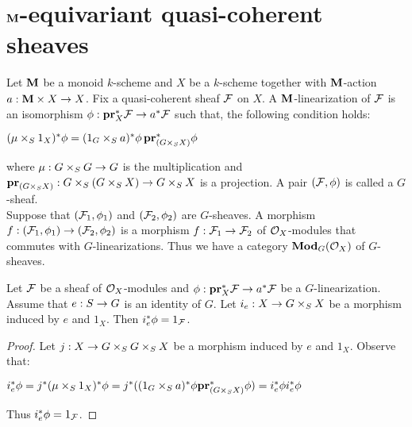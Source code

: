 \section{$\mathbf{M}$-equivariant quasi-coherent sheaves}

\begin{definition}
Let $\mathbf{M}$ be a monoid $k$-scheme and $X$ be a $k$-scheme together with $\mathbf{M}$-action $a:\mathbf{M}\times X\rightarrow X$. Fix a quasi-coherent sheaf ${\mathcal F}$ on $X$. A $\mathbf{M}$-linearization of ${\mathcal F}$ is an isomorphism $\phi:\mathbf{pr}_X^*{\mathcal F}\rightarrow a^*{\mathcal F}$ such that, the following condition holds:
\begin{center}
$(\mu\times_S1_X)^*\phi=(1_G\times_Sa)^*\phi\, \mathbf{pr}_{(G\times_SX)}^*\phi$
\end{center}
where $\mu:G\times_SG\rightarrow G$ is the multiplication and $\mathbf{pr}_{(G\times_SX)}:G\times_S(G\times_SX)\rightarrow G\times_SX$ is a projection. A pair $({\mathcal F},\phi)$ is called a $G$-sheaf.\\
Suppose that $({\mathcal F}_1,\phi_1)$ and $({\mathcal F}_2,\phi_2)$ are $G$-sheaves. A morphism $f:({\mathcal F}_1,\phi_1)\rightarrow ({\mathcal F}_2,\phi_2)$ is a morphism $f:{\mathcal F}_1\rightarrow {\mathcal F}_2$ of ${\mathcal O}_X$-modules that commutes with $G$-linearizations. Thus we have a category $\mathbf{Mod}_G({\mathcal O}_X)$ of $G$-sheaves.
\end{definition}

\begin{proposition}
Let ${\mathcal F}$ be a sheaf of ${\mathcal O}_X$-modules and $\phi:\mathbf{pr}_X^*{\mathcal F}\rightarrow a^*{\mathcal F}$ be a $G$-linearization. Assume that $e:S\rightarrow G$ is an identity of $G$. Let $i_e:X\rightarrow G\times_SX$ be a morphism induced by $e$ and $1_X$. Then $i^*_e\phi=1_{{\mathcal F}}$.
\end{proposition}
\begin{proof}
Let $j:X\rightarrow G\times_SG\times_SX$ be a morphism induced by $e$ and $1_X$. Observe that:
\begin{center}
$i_e^*\phi=j^*(\mu\times_S1_X)^*\phi=j^*((1_G\times_Sa)^*\phi\mathbf{pr}^*_{(G\times_SX)}\phi)=i^*_e\phi i^*_e\phi$
\end{center}
Thus $i_e^*\phi=1_{{\mathcal F}}$.
\end{proof}

